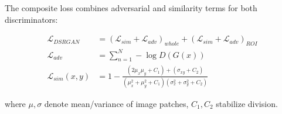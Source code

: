 \documentclass{article}
\begin{document}
The composite loss combines adversarial and similarity terms for both discriminators:

\begin{align}
\mathcal{L}_{DSRGAN} &= (\mathcal{L}_{sim} + \mathcal{L}_{adv})_{whole} + (\mathcal{L}_{sim} + \mathcal{L}_{adv})_{ROI} \\
\mathcal{L}_{adv} &= \sum_{n=1}^N -\log D(G(x)) \\
\mathcal{L}_{sim}(x,y) &= 1 - \frac{(2\mu_x\mu_y + C_1) + (\sigma_{xy} + C_2)}{(\mu_x^2 + \mu_y^2 + C_1)(\sigma_x^2 + \sigma_y^2 + C_2)}
\end{align}

where $\mu,\sigma$ denote mean/variance of image patches, $C_1,C_2$ stabilize division.

        
        
    
    
\end{document}
